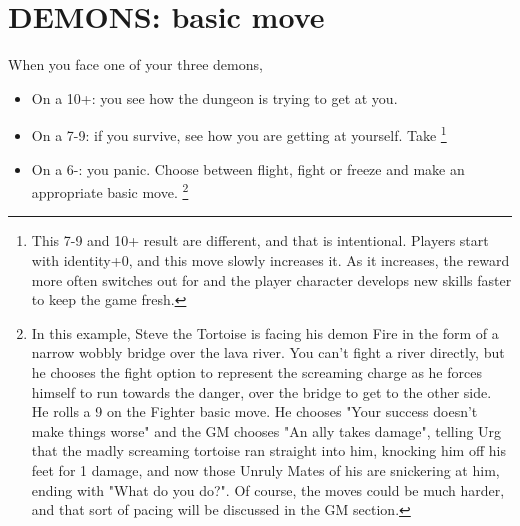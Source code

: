 \documentclass{tufte-book}
\begin{document}
\section{DEMONS: basic move}
When you face one of your three demons, 
\begin{itemize}
\item On a 10+: you see how the dungeon is trying to get at you. 
\item On a 7-9: if you survive, see how you are getting at yourself. Take  \footnote{This 7-9 and 10+ result are different, and that is intentional. Players start with identity+0, and this move slowly increases it. As it increases, the reward more often switches out for  and the player character develops new skills faster to keep the game fresh. }
\item On a 6-: you panic. Choose between flight, fight or freeze and make an appropriate basic move. \footnote {In this example, Steve the Tortoise is facing his demon Fire in the form of a narrow wobbly bridge over the lava river. You can't fight a river directly, but he chooses the fight option to represent the screaming charge as he forces himself to run towards the danger, over the bridge to get to the other side. He rolls a 9 on the Fighter basic move. He chooses "Your success doesn't make things worse" and the GM chooses "An ally takes damage", telling Urg that the madly screaming tortoise ran straight into him, knocking him off his feet for 1 damage, and now those Unruly Mates of his are snickering at him, ending with "What do you do?". Of course, the moves could be much harder, and that sort of pacing will be discussed in the GM section.}
\end{itemize}

\bigskip
\end{document}
